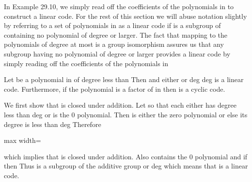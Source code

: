 \documentclass[11pt,oneside]{article}
\begin{document}
\begin{BookBody}

In Example 29.10, we simply read off the coefficients of the polynomials in  to construct a linear code. For the rest of this section we will abuse notation slightly by referring to a set  of polynomials in  as a linear code if  is a subgroup of  containing no polynomial of degree  or larger. The fact that \BookInline{\phi } mapping  to the polynomials of degree at most  is a group isomorphism assures us that any subgroup  having no polynomial of degree  or larger provides a linear code by simply reading off the coefficients of the polynomials in 

 Let  be a polynomial in  of degree less than  Then   and either  or deg deg is a linear code. Furthermore, if the polynomial  is a factor of  in  then  is a cyclic code.

 We first show that  is closed under addition. Let  so that each either has degree less than  deg or is the 0 polynomial. Then  is either the zero polynomial or else its degree is less than  deg Therefore

\begin{center}\begin{adjustbox}{max width=\linewidth}\end{adjustbox}\end{center}

\noindent which implies that  is closed under addition. Also  contains the 0 polynomial and if  then  Thus  is a subgroup of the additive group  or deg which means that  is a linear code.


\end{BookBody}
\end{document}
